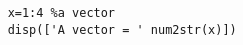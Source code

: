 \documentclass{article} \usepackage{minted}
\begin{document}
 
\begin{verbatim}
    x=1:4 %a vector
    disp(['A vector = ' num2str(x)])
\end{verbatim}
\end{document}
